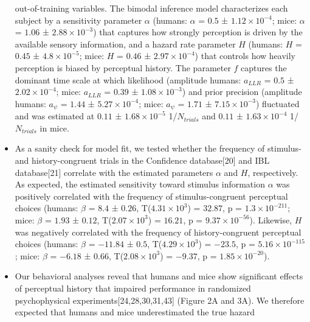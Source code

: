 \documentclass[
]{article}
\begin{document}
\begin{itemize}
  out-of-training variables. The bimodal inference model characterizes
  each subject by a sensitivity parameter \(\alpha\) (humans: \(\alpha\)
  = \(0.5\) ± \(\ensuremath{1.12\times 10^{-4}}\); mice: \(\alpha\) =
  \(1.06\) ± \(\ensuremath{2.88\times 10^{-3}}\)) that captures how
  strongly perception is driven by the available sensory information,
  and a hazard rate parameter \(H\) (humans: \(H\) = \(0.45\) ±
  \(\ensuremath{4.8\times 10^{-5}}\); mice: \(H\) = \(0.46\) ±
  \(\ensuremath{2.97\times 10^{-4}}\)) that controls how heavily
  perception is biased by perceptual history. The parameter \(f\)
  captures the dominant time scale at which likelihood (amplitude
  humans: \(a_{LLR}\) = \(0.5\) ± \(\ensuremath{2.02\times 10^{-4}}\);
  mice: \(a_{LLR}\) = \(0.39\) ± \(\ensuremath{1.08\times 10^{-3}}\))
  and prior precision (amplitude humans: \(a_{\psi}\) = \(1.44\) ±
  \(\ensuremath{5.27\times 10^{-4}}\); mice: \(a_{\psi}\) = \(1.71\) ±
  \(\ensuremath{7.15\times 10^{-3}}\)) fluctuated and was estimated at
  \(0.11\) ± \(\ensuremath{1.68\times 10^{-5}}\) 1/\(N_{trials}\) and
  \(0.11\) ± \(\ensuremath{1.63\times 10^{-4}}\) 1/\(N_{trials}\) in
  mice.
\item
  As a sanity check for model fit, we tested whether the frequency of
  stimulus- and history-congruent trials in the Confidence
  database{[}20{]} and IBL database{[}21{]} correlate with the estimated
  parameters \(\alpha\) and \(H\), respectively. As expected, the
  estimated sensitivity toward stimulus information \(\alpha\) was
  positively correlated with the frequency of stimulus-congruent
  perceptual choices (humans: \(\beta\) = \(8.4\) ± \(0.26\),
  T(\(\ensuremath{4.31\times 10^{3}}\)) = \(32.87\), p =
  \(\ensuremath{1.3\times 10^{-211}}\); mice: \(\beta\) = \(1.93\) ±
  \(0.12\), T(\(\ensuremath{2.07\times 10^{3}}\)) = \(16.21\), p =
  \(\ensuremath{9.37\times 10^{-56}}\)). Likewise, \(H\) was negatively
  correlated with the frequency of history-congruent perceptual choices
  (humans: \(\beta\) = \(-11.84\) ± \(0.5\),
  T(\(\ensuremath{4.29\times 10^{3}}\)) = \(-23.5\), p =
  \(\ensuremath{5.16\times 10^{-115}}\); mice: \(\beta\) = \(-6.18\) ±
  \(0.66\), T(\(\ensuremath{2.08\times 10^{3}}\)) = \(-9.37\), p =
  \(\ensuremath{1.85\times 10^{-20}}\)).
\item
  Our behavioral analyses reveal that humans and mice show significant
  effects of perceptual history that impaired performance in randomized
  psychophysical experiments{[}24,28,30,31,43{]} (Figure 2A and 3A). We
  therefore expected that humans and mice underestimated the true hazard

\end{itemize}
\end{document}
